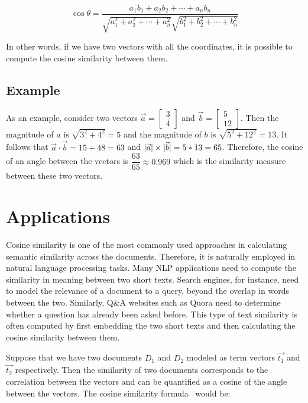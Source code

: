 \documentclass[11pt]{article}
\DeclarePairedDelimiter\abs{\lvert}{\rvert}               %
\begin{document}
\[ \cos\theta = \dfrac{a_1b_1 + a_2b_2 + \cdots + a_nb_n}{\sqrt{a_1^2 + a_2^2 + \cdots + a_n^2}\sqrt{b_1^2 + b_2^2 + \cdots + b_n^2}} \]

In other words, if we have two vectors with all the coordinates, it is possible
to compute the cosine similarity between them.

\subsection{Example}

As an example, consider two vectors
\(\vec{a} = \begin{bmatrix}3 \\ 4\end{bmatrix}\)
and \(\vec{b} = \begin{bmatrix}5 \\ 12\end{bmatrix}\). Then the magnitude of \(a\) is
\(\sqrt{3^2 + 4^2} = 5\) and the magnitude of \(b\) is \(\sqrt{5^2 + 12^2} = 13\).
It follows that \(\vec{a} \cdot \vec{b} = 15 + 48 = 63\) and
\(\abs{\vec{a}} \times \abs{\vec{b}} = 5 * 13 = 65\). Therefore, the cosine of
an angle between the vectors is \(\dfrac{63}{65} \approx 0.969\) which is the
similarity measure between these two vectors.


\section{Applications}

Cosine similarity is one of the most commonly used approaches in calculating
semantic similarity across the documents. Therefore, it is naturally employed
in natural language processing tasks. Many NLP applications need to compute the
similarity in meaning between two short texts. Search engines, for instance,
need to model the relevance of a document to a query, beyond the overlap in
words between the two. Similarly, Q\&A websites such as Quora need to determine
whether a question has already been asked before. This type of text similarity
is often computed by first embedding the two short texts and then calculating
the cosine similarity between them.

\bigskip

Suppose that we have two documents \(D_1\) and \(D_2\) modeled as term vectors
\(\vec{t_1}\) and \(\vec{t_2}\) respectively. Then the similarity of two
documents corresponds to the correlation between the vectors and can be
quantified as a cosine of the angle between the vectors. The cosine similarity
formula~\cite{huang2008} would be:
\end{document}
